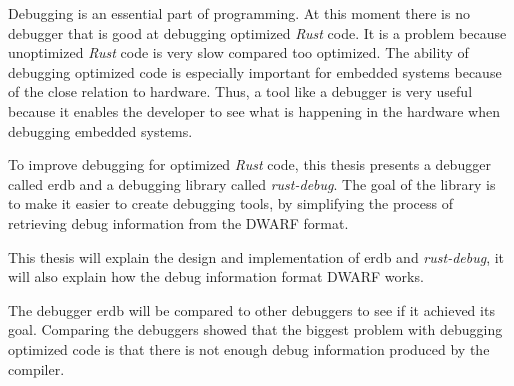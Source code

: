 Debugging is an essential part of programming.
At this moment there is no debugger that is good at debugging optimized \emph{Rust} code.
It is a problem because unoptimized \emph{Rust} code is very slow compared too optimized.
The ability of debugging optimized code is especially important for embedded systems because of the close relation to hardware.
Thus, a tool like a debugger is very useful because it enables the developer to see what is happening in the hardware when debugging embedded systems.


To improve debugging for optimized \emph{Rust} code, this thesis presents a debugger called \acrshort{erdb} and a debugging library called \emph{rust-debug}.
The goal of the library is to make it easier to create debugging tools, by simplifying the process of retrieving debug information from the \acrshort{DWARF} format.


This thesis will explain the design and implementation of \acrshort{erdb} and \emph{rust-debug}, it will also explain how the debug information format \acrshort{DWARF} works.


The debugger \acrshort{erdb} will be compared to other debuggers to see if it achieved its goal.
Comparing the debuggers showed that the biggest problem with debugging optimized code is that there is not enough debug information produced by the compiler.

